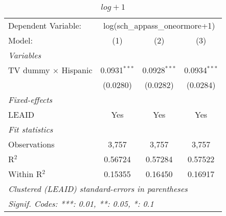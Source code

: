 \begin{table}[htbp]
\centering
\caption{ $log + 1$}
\begin{tabular}{lccc}
\tabularnewline\midrule\midrule
Dependent Variable:&\multicolumn{3}{c}{log(sch\_appass\_oneormore+1)}\\
Model:&(1) & (2) & (3)\\
\midrule \emph{Variables}&   &   &  \\
TV dummy $\times$ Hispanic & 0.0931$^{***}$ & 0.0928$^{***}$ & 0.0934$^{***}$\\
  &(0.0280) & (0.0282) & (0.0284)\\
\midrule \emph{Fixed-effects}&   &   &  \\
LEAID & Yes & Yes & Yes\\
\midrule \emph{Fit statistics}&  & & \\
Observations & 3,757&3,757&3,757\\
R$^2$ & 0.56724&0.57284&0.57522\\
Within R$^2$ & 0.15355&0.16450&0.16917\\
\midrule\midrule\multicolumn{4}{l}{\emph{Clustered (LEAID) standard-errors in parentheses}}\\
\multicolumn{4}{l}{\emph{Signif. Codes: ***: 0.01, **: 0.05, *: 0.1}}\\
\end{tabular}
\end{table}

